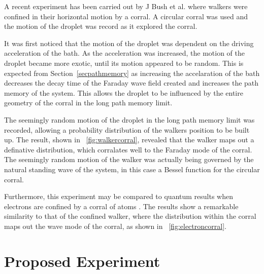 \documentclass[11pt]{article}
\newcommand{\figref}[2][\figurename~]{#1\ref{#2}}
\newcommand{\secref}[2][Section~]{#1\ref{#2}}
\begin{document}
A recent experiment has been carried out by J Bush et al. \cite{12} where walkers were confined in their horizontal motion by a corral.  A circular corral was used and the motion of the droplet was record as it explored the corral.

It was first noticed that the motion of the droplet was dependent on the driving acceleration of the bath.  As the acceleration was increased, the motion of the droplet became more exotic, until its motion appeared to be random.  This is expected from \secref{secpathmemory} as increasing the accelaration of the bath decreases the decay time of the Faraday wave field created and increases the path memory of the system.  This allows the droplet to be influenced by the entire geometry of the corral in the long path memory limit.

The seemingly random motion of the droplet in the long path memory limit was recorded, allowing a probability distribution of the walkers position to be built up.  The result, shown in \figref{fig:walkercorral}, revealed that the walker maps out a definative distribution, which corralates well to the Faraday mode of the corral.  The seemingly random motion of the walker was actually being governed by the natural standing wave of the system, in this case a Bessel function for the circular corral.

Furthermore, this experiment may be compared to quantum results when electrons are confined by a corral of atoms \cite{21}.  The results show a remarkable similarity to that of the confined walker, where the distribution within the corral maps out the wave mode of the corral, as shown in \figref{fig:electroncorral}.


\section{Proposed Experiment}
\label{sec:proposedexperiment}
\end{document}
